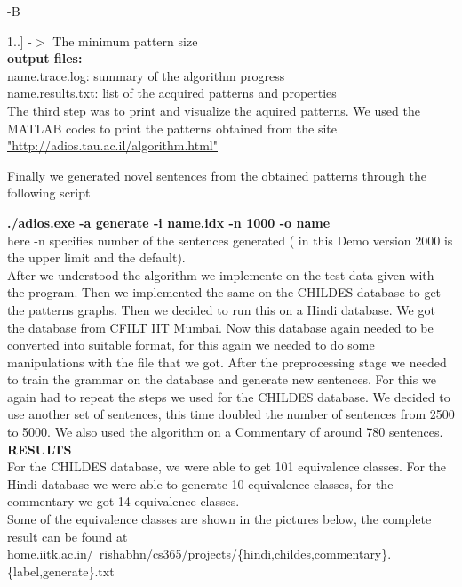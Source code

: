 \def\DevnagVersion{2.15}\documentclass[14 pt]{article}
\begin{document}
-B {1..]       -$>$ The minimum pattern size\\

{\bf output files:}\\

name.trace.log: summary of the algorithm progress\\

name.results.txt: list of the acquired patterns and properties\\

The third step was to print and visualize the aquired patterns. We used the MATLAB codes to print the patterns obtained from the site
\url {"http://adios.tau.ac.il/algorithm.html"}

Finally we generated novel sentences from the obtained patterns through the following script

{\bf ./adios.exe -a generate -i name.idx -n 1000 -o name }\\

here -n specifies number of the sentences generated ( in this Demo version 2000 is the upper limit and the default).\\

After we understood the algorithm we implemente on the test data given with the program. Then we implemented the same on the CHILDES database to get the patterns graphs. Then we decided to run this on a Hindi database. We got the database from CFILT IIT Mumbai. Now this database again needed to be converted into suitable format, for this again we needed to do some manipulations with the file that we got. After the preprocessing stage we needed to train the grammar on the database and generate new sentences. For this we again had to
repeat the steps we used for the CHILDES database. We decided to use another set of sentences, this time doubled the number of
sentences from 2500 to 5000. We also used the algorithm on a Commentary of around 780 sentences.
\\

{\large \center \bf RESULTS\\}
For the CHILDES database, we were able to get 101 equivalence classes. For the Hindi database we were able to generate 10 equivalence classes, for the commentary we got 14 equivalence classes.\\
Some of the equivalence classes are shown in the pictures below, the complete result can be found at\\
 home.iitk.ac.in/~rishabhn/cs365/projects/\{hindi,childes,commentary\}.\{label,generate\}.txt \\

}
\end{document}
